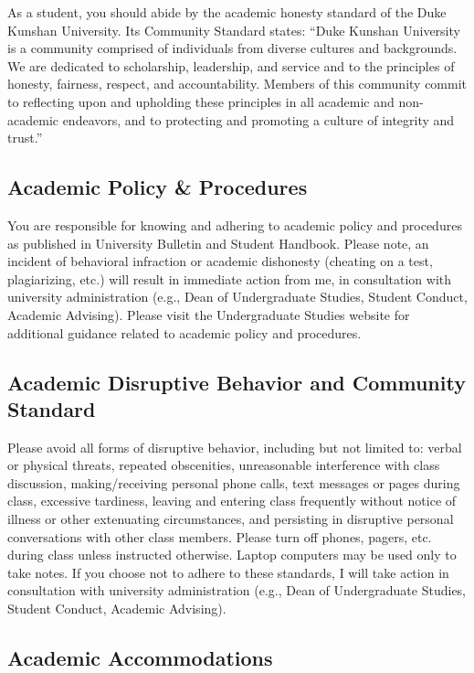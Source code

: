 \documentclass[11pt]{article}
\begin{document}
As a student, you should abide by the academic honesty standard of the Duke Kunshan University. Its Community Standard states: ``Duke Kunshan University is a community comprised of individuals from diverse cultures and backgrounds.  We are dedicated to scholarship, leadership, and service and to the principles of honesty, fairness, respect, and accountability. Members of this community commit to reflecting upon and upholding these principles in all academic and non-academic endeavors, and to protecting and promoting a culture of integrity and trust.''

\subsection{Academic Policy \& Procedures}

You are responsible for knowing and adhering to academic policy and procedures as published in University Bulletin and Student Handbook. Please note, an incident of behavioral infraction or academic dishonesty (cheating on a test, plagiarizing, etc.) will result in immediate action from me, in consultation with university administration (e.g., Dean of Undergraduate Studies, Student Conduct, Academic Advising).  Please visit the Undergraduate Studies website for additional guidance related to academic policy and procedures.

\subsection{Academic Disruptive Behavior and Community Standard}

Please avoid all forms of disruptive behavior, including but not limited to: verbal or physical threats, repeated obscenities, unreasonable interference with class discussion, making/receiving personal phone calls, text messages or pages during class, excessive tardiness, leaving and entering class frequently without notice of illness or other extenuating circumstances, and persisting in disruptive personal conversations with other class members.  Please turn off phones, pagers, etc. during class unless instructed otherwise.  Laptop computers may be used only to take notes. If you choose not to adhere to these standards, I will take action in consultation with university administration (e.g., Dean of Undergraduate Studies, Student Conduct, Academic Advising).

\subsection{Academic Accommodations}
\end{document}
